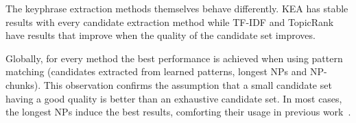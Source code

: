       
      The keyphrase extraction methods themselves behave differently. KEA has
      stable results with every candidate extraction method while TF-IDF and
      TopicRank have results that improve when the quality of the candidate set
      improves.

      Globally, for every method the best performance is achieved when using
      pattern matching (candidates extracted from learned patterns, longest NPs
      and NP-chunks). This observation confirms the assumption that a small
      candidate set having a good quality is better than an exhaustive
      candidate set. In most cases, the longest NPs induce the best results,
      comforting their usage in previous
      work~\cite{wan2008expandrank,hassan2010conundrums,bougouin2013topicrank}.

